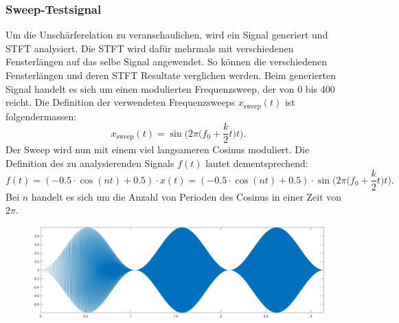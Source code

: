 \subsubsection{Sweep-Testsignal}
Um die Unschärferelation zu veranschaulichen, wird ein Signal generiert und STFT analysiert. Die STFT wird dafür mehrmals mit verschiedenen Fensterlängen auf das selbe Signal angewendet. So können die verschiedenen Fensterlängen und deren STFT Resultate verglichen werden. Beim generierten Signal handelt es sich um einen modulierten Frequenzsweep, der von 0 bis 400\text{[Hz]} reicht. Die Definition der verwendeten Frequenzsweeps $x_{\text{sweep}}(t)$ ist folgendermassen:
\[
x_{\text{sweep}}(t) = \sin \biggl( 2\pi \biggl(f_0 +\frac{k}2t\biggr) t \biggr).
\]
Der Sweep wird nun mit einem viel langsameren Cosinus moduliert. Die Definition des zu analysierenden Signals $f(t)$ lautet dementsprechend:
\begin{equation}
f(t)= (-0.5\cdot \cos(nt)+0.5)\cdot x(t)=(-0.5\cdot \cos(nt)+0.5)\cdot \sin \biggl( 2\pi \biggl(f_0 +\frac{k}2t\biggr) t \biggr).
\label{eq:sin-sweep}
\end{equation}
Bei $n$ handelt es sich um die Anzahl von Perioden des Cosinus in einer Zeit von $2\pi$.

\begin{figure}
\centering
\includegraphics[width=\linewidth]{papers/autotune/sections/fft/signal-clipped.jpg}
\label{fig:stftsig}

\end{figure}%

